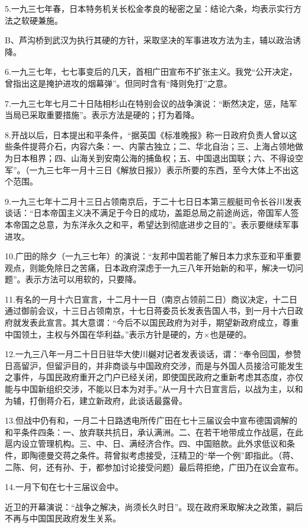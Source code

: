 5.一九三七年春，日本特务机关长松金孝良的秘密之呈：结论六条，均表示实行方法之软硬兼施。

B、芦沟桥到武汉为执行其硬的方针，采取坚决的军事进攻方法为主，辅以政治诱降。

6.一九三七年，七七事变后的几天，首相广田宣布不扩张主义。我党“公开决定，曾指出这是掩护进攻的烟幕弹”。但同时含有“降则免打”之意。

7.一九三七年七月二十日陆相杉山在特别会议的战争演说：“断然决定，惩，陆军当局已采取重要措施”。表示方法是硬的；打为着降。

8.开战以后，日本提出和平条件，“据英国《标准晚报》称一日政府负责人曾以这些条件提蒋介石，内容六条：一、内蒙古独立；二、华北自治；三、上海占领地做为日本租界；四、山海关到安南公海的捕鱼权；五、中国退出国联；六、不得设空军”。（一九三七年一月十三日《解放日报》）表示所要的东西，至今大体上不出这个范围。

9.一九三七年十二月十三日占领南京后，于二十七日日本第三舰艇司令长谷川发表谈话：“日本帝国主义决不满足于今日的成功，盖距总局之前途尚远，帝国军人签本帝国之总意，为东洋永久之和平，希望达到彻底进步之目的”。表示要继续军事进攻。

10.广田的除夕（一九三七年）的演说：“友邦中国若能了解日本力求东亚和平重要观点，则能免除日之苦痛，日本政府深虑于一九三八年开始新的和平，解决一切问题”。表示方法可以用软的，只要降。

11.有名的一月十六日宣言，十二月十一日（南京占领前二日）商议决定，十二日通过御前会议，十三日占领南京，十七日蒋委员长发表告国人书，到一月十六日政府就发表此宣言。其大意谓：“今后不以国民政府为对手，期望新政府成立，尊重中国领土，主权与外国在华利益。”表示方针是硬的，方×也是硬的。

12.一九三八年一月二十日日驻华大使川樾对记者发表谈话，谓：“奉令回国，参赞日高留沪，但留沪目的，并非商谈与中国政府交涉，而是与外国人员接洽可能发生之事件，与国民政府重开之门户已经关闭，即使国民政府之重新考虑其态度，亦仅能与中国新组织交涉，不能以日本为对手。”从一月十六日宣言后，以战为主，以和为辅，打倒蒋介石，建立新政府，此谈话最露骨。

13.但战中仍有和，一月二十日路透电所传广田在七十三届议会中宣布德国调解的和平条件四条：一、放弃联共抗日，承认满洲。二、在若干地带成立作战扈，在此扈内设立管理机构。三、中、日、满经济合作。四、中国赔款。此外求低议和条件，即陶德曼交蒋之条件。蒋曾拟考虑接受，汪精卫的“举一个例”即指此。（蒋、二陈、何，还有孙、于，都参加讨论接受问题）最后蒋拒绝，广田乃在议会宣布。

14.一月下旬在七十三届议会中。

近卫的开幕演说：“战争之解决，尚须长久时日”。现在政府釆取解决之政策，嗣后不再与中国国民政府发生关系。

